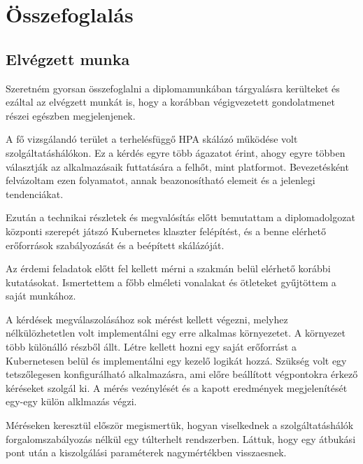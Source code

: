 \chapter{Összefoglalás}
\label{sec:summary}


\section{Elvégzett munka}

Szeretném gyorsan összefoglalni a diplomamunkában tárgyalásra kerülteket és ezáltal az elvégzett munkát is, hogy a korábban végigvezetett gondolatmenet részei egészben megjelenjenek.

A fő vizsgálandó terület a terhelésfüggő HPA skálázó működése volt szolgáltatáshálókon.
Ez a kérdés egyre több ágazatot érint, ahogy egyre többen választják az alkalmazásaik futtatására a felhőt, mint platformot.
Bevezetésként felvázoltam ezen folyamatot, annak beazonosítható elemeit és a jelenlegi tendenciákat.

Ezután a technikai részletek és megvalósítás előtt bemutattam a diplomadolgozat központi szerepét játszó Kubernetes klaszter felépítést, és a benne elérhető erőforrások szabályozását és a beépített skálázóját.

Az érdemi feladatok előtt fel kellett mérni a szakmán belül elérhető korábbi kutatásokat. Ismertettem a főbb elméleti vonalakat és ötleteket gyűjtöttem a saját munkához.

A kérdések megválaszolásához sok mérést kellett végezni, melyhez nélkülözhetetlen volt implementálni egy erre alkalmas környezetet. 
A környezet több különálló részből állt.
Létre kellett hozni egy saját erőforrást a Kubernetesen belül és implementálni egy kezelő logikát hozzá.
Szükség volt egy tetszőlegesen konfigurálható alkalmazásra, ami előre beállított végpontokra érkező kéréseket szolgál ki.
A mérés vezénylését és a kapott eredmények megjelenítését egy-egy külön alklmazás végzi.

Méréseken keresztül először megismertük, hogyan viselkednek a szolgáltatáshálók forgalomszabályozás nélkül egy túlterhelt rendszerben. 
Láttuk, hogy egy átbukási pont után a kiszolgálási paraméterek nagymértékben visszaesnek.

